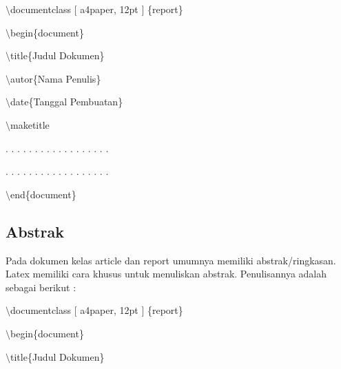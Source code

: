 $\setminus$documentclass $[$ a4paper, 12pt $]$ \{report\}\par \vspace{12pt}

$\setminus$begin\{document\}\par \vspace{12pt}

$\setminus$title\{Judul Dokumen\}\par \vspace{12pt}

$\setminus$autor\{Nama Penulis\}\par \vspace{12pt}

$\setminus$date\{Tanggal Pembuatan\}\par \vspace{12pt}

$\setminus$maketitle\par \vspace{12pt}

. . . . . . . . . . . . . . . . . .

. . . . . . . . . . . . . . . . . .\par \vspace{12pt}

$\setminus$end\{document\}\par \vspace{12pt}



\subsection {Abstrak}\par \vspace{12pt}

Pada dokumen kelas article dan report umumnya memiliki 
abstrak/ringkasan. Latex memiliki cara khusus untuk menuliskan abstrak. Penulisannya adalah sebagai berikut :\par \vspace{12pt}

$\setminus$documentclass $[$ a4paper, 12pt $]$ \{report\}\par \vspace{12pt}

$\setminus$begin\{document\}\par \vspace{12pt}

$\setminus$title\{Judul Dokumen\}\par \vspace{12pt}

